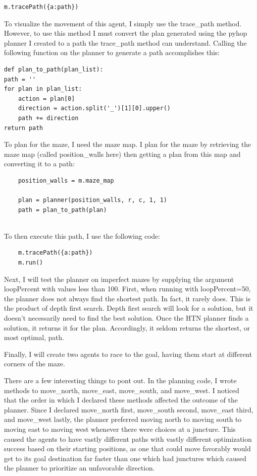 \documentclass[10pt,twocolumn]{article}
\begin{document}
\begin{verbatim}
m.tracePath({a:path})

\end{verbatim}

To visualize the movement of this agent, I simply use the trace\_path method. However, to use this method I must convert the plan generated using the pyhop planner I created to a path the trace\_path method can understand. Calling the following function on the planner to generate a path accomplishes this:

\begin{verbatim}
def plan_to_path(plan_list):
path = ''
for plan in plan_list:
    action = plan[0]
    direction = action.split('_')[1][0].upper()
    path += direction
return path
\end{verbatim}

To plan for the maze, I need the maze map. I plan for the maze by retrieving the maze map (called position\_walls here) then getting a plan from this map and converting it to a path:

\begin{verbatim}
    position_walls = m.maze_map

    plan = planner(position_walls, r, c, 1, 1)
    path = plan_to_path(plan)
    
\end{verbatim}

To then execute this path, I use the following code:

\begin{verbatim}
    m.tracePath({a:path})
    m.run()

\end{verbatim}

Next, I will test the planner on imperfect mazes by supplying the argument loopPercent with values less than 100. First, when running with loopPercent=50,  the planner does not always find the shortest path. In fact, it rarely does. This is the product of depth first search. Depth first search will look for a solution, but it doesn’t necessarily need to find the best solution. Once the HTN planner finds a solution, it returns it for the plan. Accordingly, it seldom returns the shortest, or most optimal, path.

Finally, I will create two agents to race to the goal, having them start at different corners of the maze. 

There are a few interesting things to pont out. In the planning code, I wrote methods to move\_north, move\_east, move\_south, and move\_west. I noticed that the order in which I declared these methods affected the outcome of the planner. Since I declared move\_north first, move\_south second, move\_east third, and move\_west lastly, the planner preferred moving north to moving south to moving east to moving west whenever there were choices at a juncture. This caused the agents to have vastly different paths with vastly different optimization success based on their starting positions, as one that could move favorably would get to its goal destination far faster than one which had junctures which caused the planner to prioritize an unfavorable direction.
\end{document}
